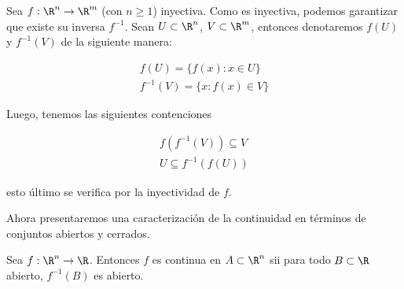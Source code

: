\begin{nota}
    Sea $f: \R^n \rightarrow \R^m$ (con $n \geq 1$) inyectiva. Como es inyectiva, podemos garantizar que existe su inversa $f^{-1}$. Sean $U \subset \R^n$, $V \subset \R^m$, entonces denotaremos $f(U)$ y $f^{-1}(V)$ de la siguiente manera:
    
    \begin{gather*}
        f(U) = \{ f(x) : x \in U \} \\
        f^{-1}(V) = \{ x : f(x) \in V \}
    \end{gather*}
    
    Luego, tenemos las siguientes contenciones
    
    \begin{gather*}
        f\left( f^{-1}(V) \right) \subseteq V \\
        U \subseteq f^{-1}\left( f(U) \right)
    \end{gather*}
    
    \noindent esto último se verifica por la inyectividad de $f$.
\end{nota}

Ahora presentaremos una caracterización de la continuidad en términos de conjuntos abiertos y cerrados.

\begin{teo}
    Sea $f: \R^n \rightarrow \R$. Entonces $f$ es continua en $A \subset \R^n$ sii para todo $B \subset \R$ abierto, $f^{-1}(B)$ es abierto.
\end{teo}

